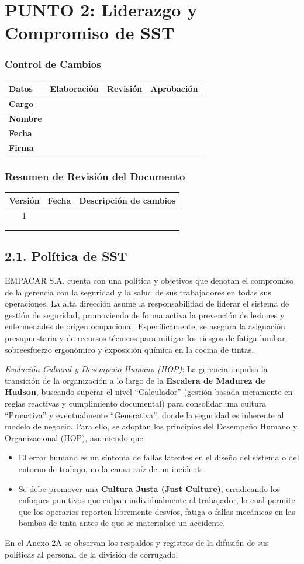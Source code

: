 \documentclass[11pt, letterpaper]{article}
\newcommand{\controlcambios}{
    \subsubsection*{Control de Cambios}
    \begin{table}[H]
        \centering
        \small
        \begin{tabular}{lp{4cm}p{4cm}p{4cm}}
            \toprule
            \textbf{Datos} & \textbf{Elaboración} & \textbf{Revisión} & \textbf{Aprobación} \\
            \midrule
            \textbf{Cargo} & & & \\
            \textbf{Nombre} & & & \\
            \textbf{Fecha} & & & \\
            \textbf{Firma} & & & \\
            \bottomrule
        \end{tabular}
    \end{table}
}
\newcommand{\resumenrevision}[1]{
    \subsubsection*{Resumen de Revisión del Documento}
    \begin{table}[H]
        \centering
        \small
        \begin{tabular}{ccp{8cm}}
            \toprule
            \textbf{Versión} & \textbf{Fecha} & \textbf{Descripción de cambios} \\
            \midrule
            #1 & & \\
            & & \\
            & & \\
            \bottomrule
        \end{tabular}
    \end{table}
}
\begin{document}
\newpage
\section{PUNTO 2: Liderazgo y Compromiso de SST}
\controlcambios
\resumenrevision{1}

\subsection{2.1. Política de SST}
EMPACAR S.A. cuenta con una política y objetivos que denotan el compromiso de la gerencia con la seguridad y la salud de sus trabajadores en todas sus operaciones. La alta dirección asume la responsabilidad de liderar el sistema de gestión de seguridad, promoviendo de forma activa la prevención de lesiones y enfermedades de origen ocupacional. Específicamente, se asegura la asignación presupuestaria y de recursos técnicos para mitigar los riesgos de fatiga lumbar, sobreesfuerzo ergonómico y exposición química en la cocina de tintas. 

\textit{Evolución Cultural y Desempeño Humano (HOP)}: La gerencia impulsa la transición de la organización a lo largo de la \textbf{Escalera de Madurez de Hudson}, buscando superar el nivel ``Calculador'' (gestión basada meramente en reglas reactivas y cumplimiento documental) para consolidar una cultura ``Proactiva'' y eventualmente ``Generativa'', donde la seguridad es inherente al modelo de negocio. Para ello, se adoptan los principios del Desempeño Humano y Organizacional (HOP), asumiendo que:
\begin{itemize}
    \item El error humano es un síntoma de fallas latentes en el diseño del sistema o del entorno de trabajo, no la causa raíz de un incidente.
    \item Se debe promover una \textbf{Cultura Justa (Just Culture)}, erradicando los enfoques punitivos que culpan individualmente al trabajador, lo cual permite que los operarios reporten libremente desvíos, fatiga o fallas mecánicas en las bombas de tinta antes de que se materialice un accidente.
\end{itemize}

En el Anexo 2A se observan los respaldos y registros de la difusión de sus políticas al personal de la división de corrugado.
\end{document}
